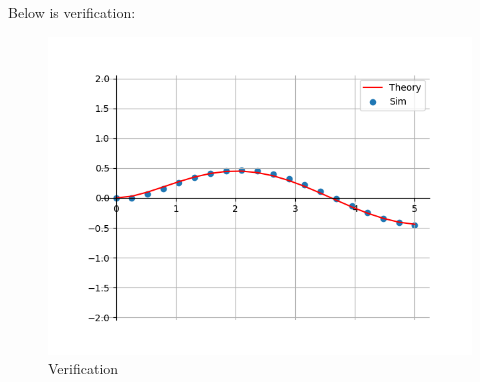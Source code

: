 \documentclass[journal]{IEEEtran}
\begin{document}
    
    Below is verification:
    \begin{figure}[ht]  
        \centering  
        \includegraphics[width=\columnwidth]{figs/fig1_.png}  
        \caption{Verification}
    \end{figure}


\end{document}
